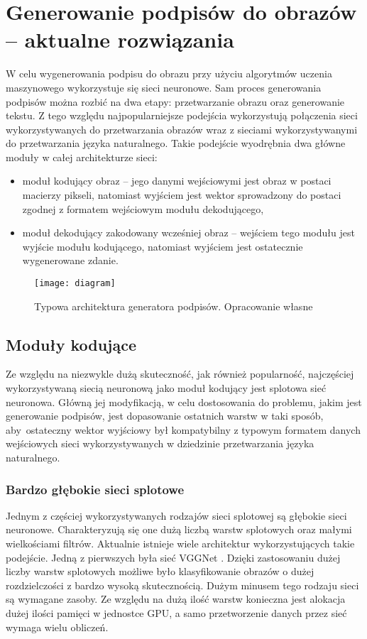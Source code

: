 \newpage %
\section{Generowanie podpisów do obrazów -- aktualne rozwiązania}
W celu wygenerowania podpisu do obrazu przy użyciu algorytmów uczenia maszynowego wykorzystuje się sieci neuronowe. Sam proces generowania podpisów można rozbić na dwa etapy: przetwarzanie obrazu oraz generowanie tekstu. Z tego względu najpopularniejsze podejścia wykorzystują połączenia sieci wykorzystywanych do przetwarzania obrazów wraz z sieciami wykorzystywanymi do przetwarzania języka naturalnego. Takie podejście wyodrębnia dwa główne moduły w całej architekturze sieci:
\begin{itemize}
  \item moduł kodujący obraz -- jego danymi wejściowymi jest obraz w postaci macierzy pikseli, natomiast wyjściem jest wektor sprowadzony do postaci zgodnej z formatem wejściowym modułu dekodującego,
  \item moduł dekodujący zakodowany wcześniej obraz -- wejściem tego modułu jest wyjście modułu kodującego, natomiast wyjściem jest ostatecznie wygenerowane zdanie.
\end{itemize}
\begin{figure}[H]
  \centering
  \texttt{[image: diagram]}
  \caption{Typowa architektura generatora podpisów. Opracowanie własne}
  \label{fig:schemat-captioning}
\end{figure}
\subsection{Moduły kodujące}
Ze względu na niezwykle dużą skuteczność, jak również popularność, najczęściej wykorzystywaną siecią neuronową jako moduł kodujący jest splotowa sieć neuronowa. Główną jej modyfikacją, w celu dostosowania do problemu, jakim jest generowanie podpisów, jest dopasowanie ostatnich warstw w taki sposób, aby~ostateczny wektor wyjściowy był kompatybilny z typowym formatem danych wejściowych sieci wykorzystywanych w dziedzinie przetwarzania języka naturalnego.
\subsubsection{Bardzo głębokie sieci splotowe}
Jednym z częściej wykorzystywanych rodzajów sieci splotowej są głębokie sieci neuronowe. Charakteryzują się one dużą liczbą warstw splotowych oraz małymi wielkościami filtrów. Aktualnie istnieje wiele architektur wykorzystujących takie podejście. Jedną z pierwszych była sieć VGGNet \cite{vggnet}. Dzięki zastosowaniu dużej liczby warstw splotowych możliwe było klasyfikowanie obrazów o dużej rozdzielczości z bardzo wysoką skutecznością. Dużym minusem tego rodzaju sieci są wymagane zasoby. Ze względu na dużą ilość warstw konieczna jest alokacja dużej ilości pamięci w jednostce GPU, a samo przetworzenie danych przez sieć wymaga wielu obliczeń.
